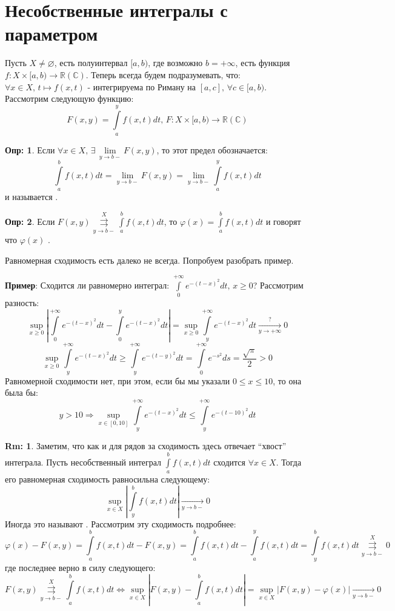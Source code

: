 \documentclass[12pt]{article}
\newcommand{\RN}[1]{%
	\textup{\uppercase\expandafter{\romannumeral#1}}%
}
\newcommand{\MR}{\mathbb{R}}
\newcommand{\MC}{\mathbb{C}}
\newcommand{\VN}{\varnothing}
\theoremstyle{definition}
\newtheorem{defn}{Опр:}
\newtheorem{rem}{Rm:}
\newcommand{\ddint}[2]{\displaystyle\int\limits_{#1}^{#2}}
\newcommand{\uconvm}[2]{\overset{#1}{\underset{#2}{\rightrightarrows}}}
\begin{document}
\lhead{Математический анализ - \RN{3}}
\section*{Несобственные интегралы с параметром}

Пусть $X \neq \VN$, есть полуинтервал $[a,b)$, где возможно $b = +\infty$, есть функция $f \colon X \times [a,b) \to \MR (\MC)$. Теперь всегда будем подразумевать, что: $\forall x \in X, \, t \mapsto f(x,t)$ - интегрируема по Риману на $[a,c], \, \forall c \in [a,b)$. Рассмотрим следующую функцию:
$$
	F(x,y) = \ddint{a}{y}f(x,t)dt, \, F \colon X\times [a,b) \to \MR(\MC)
$$
\begin{defn}
	Если $\forall x \in X, \, \exists \, \lim\limits_{y\to b-}F(x,y)$, то этот предел обозначается:
	$$
		\ddint{a}{b}f(x,t)dt = \lim\limits_{y \to b-}F(x,y) = \lim\limits_{y \to b-}\ddint{a}{y}f(x,t)dt
	$$
	и называется .
\end{defn}
\begin{defn}
	Если $F(x,y) \uconvm{X}{y \to b-} \ddint{a}{b}f(x,t)dt$, то $\varphi(x) = \ddint{a}{b}f(x,t)dt$ и говорят что  $\varphi(x)$ .
\end{defn}
Равномерная сходимость есть далеко не всегда. Попробуем разобрать пример.

\textbf{Пример}: Сходится ли равномерно интеграл: $\ddint{0}{+\infty}e^{-(t-x)^2}dt, \, x \geq 0$? Рассмотрим разность:
$$
	\sup\limits_{x \geq 0}\left|\ddint{0}{+\infty}e^{-(t-x)^2}dt - \ddint{0}{y}e^{-(t-x)^2}dt\right| = \sup\limits_{x \geq 0} \ddint{y}{+\infty}e^{-(t-x)^2}dt \xrightarrow[y \to +\infty]{?}0
$$
$$
	\sup\limits_{x \geq 0} \ddint{y}{+\infty}e^{-(t-x)^2}dt \geq \ddint{y}{+\infty}e^{-(t-y)^2}dt = \ddint{0}{+\infty}e^{-s^2}ds = \dfrac{\sqrt{\pi}}{2} > 0
$$
Равномерной сходимости нет, при этом, если бы мы указали $0 \leq x \leq 10$, то она была бы:
$$
	y > 10 \Rightarrow \sup\limits_{x \in [0,10]} \ddint{y}{+\infty}e^{-(t-x)^2}dt \leq \ddint{y}{+\infty}e^{-(t-10)^2}dt
$$
\begin{rem}
	Заметим, что как и для рядов за сходимость здесь отвечает ``хвост'' интеграла. 	Пусть несобственный интеграл $\ddint{a}{b}f(x,t)dt$ сходится $\forall x \in X$. Тогда его равномерная сходимость равносильна следующему:
	$$
		\sup\limits_{x \in X}\left|\ddint{y}{b}f(x,t)dt \right| \xrightarrow[y \to b-]{} 0
	$$
	Иногда это называют . Рассмотрим эту сходимость подробнее:
	$$
		\varphi(x) - F(x,y) = \ddint{a}{b}f(x,t)dt - F(x,y) = \ddint{a}{b}f(x,t)dt - \ddint{a}{y}f(x,t)dt = \ddint{y}{b}f(x,t)dt \uconvm{X}{y \to b-} 0
	$$
	где последнее верно в силу следующего:
	$$
		F(x,y) \uconvm{X}{y \to b-}\ddint{a}{b}f(x,t)dt \Leftrightarrow \sup\limits_{x \in X}\left|F(x,y) - \ddint{a}{b}f(x,t)dt \right| =  \sup\limits_{x \in X}\left|F(x,y) - \varphi(x) \right| \xrightarrow[y\to b-]{} 0
	$$
\end{rem}
\end{document}
